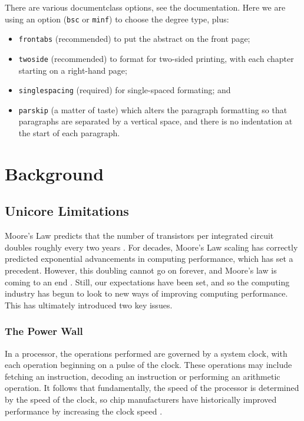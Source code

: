 \documentclass[bsc,frontabs,twoside,singlespacing,parskip,deptreport]{infthesis}     %
\begin{document}
There are various documentclass options, see the documentation.  Here we are
using an option ({\tt bsc} or {\tt minf}) to choose the degree type, plus:
\begin{itemize}
\item {\tt frontabs} (recommended) to put the abstract on the front page;
\item {\tt twoside} (recommended) to format for two-sided printing, with
  each chapter starting on a right-hand page;
\item {\tt singlespacing} (required) for single-spaced formating; and
\item {\tt parskip} (a matter of taste) which alters the paragraph formatting so that
paragraphs are separated by a vertical space, and there is no
indentation at the start of each paragraph.
\end{itemize}

\chapter{Background}

\section{Unicore Limitations} \label{unicore-limitations}
Moore’s Law predicts that the number of transistors per integrated circuit doubles roughly every two years \cite{moore_1998} \cite{moore_2006}. For decades, Moore’s Law scaling has correctly predicted exponential advancements in computing performance, which has set a precedent. However, this doubling cannot go on forever, and Moore’s law is coming to an end \cite{DBLP:journals/cse/TheisW17}. Still, our expectations have been set, and so the computing industry has begun to look to new ways of improving computing performance. This has ultimately introduced two key issues.

\subsection{The Power Wall} \label{the-power-wall}
In a processor, the operations performed are governed by a system clock, with each operation beginning on a pulse of the clock. These operations may include fetching an instruction, decoding an instruction or performing an arithmetic operation. It follows that fundamentally, the speed of the processor is determined by the speed of the clock, so chip manufacturers have historically improved performance by increasing the clock speed \cite{stallings}.
\end{document}
